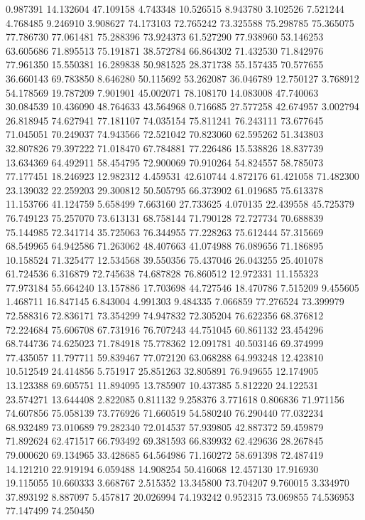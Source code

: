 0.987391
14.132604
47.109158
4.743348
10.526515
8.943780
3.102526
7.521244
4.768485
9.246910
3.908627
74.173103
72.765242
73.325588
75.298785
75.365075
77.786730
77.061481
75.288396
73.924373
61.527290
77.938960
53.146253
63.605686
71.895513
75.191871
38.572784
66.864302
71.432530
71.842976
77.961350
15.550381
16.289838
50.981525
28.371738
55.157435
70.577655
36.660143
69.783850
8.646280
50.115692
53.262087
36.046789
12.750127
3.768912
54.178569
19.787209
7.901901
45.002071
78.108170
14.083008
47.740063
30.084539
10.436090
48.764633
43.564968
0.716685
27.577258
42.674957
3.002794
26.818945
74.627941
77.181107
74.035154
75.811241
76.243111
73.677645
71.045051
70.249037
74.943566
72.521042
70.823060
62.595262
51.343803
32.807826
79.397222
71.018470
67.784881
77.226486
15.538826
18.837739
13.634369
64.492911
58.454795
72.900069
70.910264
54.824557
58.785073
77.177451
18.246923
12.982312
4.459531
42.610744
4.872176
61.421058
71.482300
23.139032
22.259203
29.300812
50.505795
66.373902
61.019685
75.613378
11.153766
41.124759
5.658499
7.663160
27.733625
4.070135
22.439558
45.725379
76.749123
75.257070
73.613131
68.758144
71.790128
72.727734
70.688839
75.144985
72.341714
35.725063
76.344955
77.228263
75.612444
57.315669
68.549965
64.942586
71.263062
48.407663
41.074988
76.089656
71.186895
10.158524
71.325477
12.534568
39.550356
75.437046
26.043255
25.401078
61.724536
6.316879
72.745638
74.687828
76.860512
12.972331
11.155323
77.973184
55.664240
13.157886
17.703698
44.727546
18.470786
7.515209
9.455605
1.468711
16.847145
6.843004
4.991303
9.484335
7.066859
77.276524
73.399979
72.588316
72.836171
73.354299
74.947832
72.305204
76.622356
68.376812
72.224684
75.606708
67.731916
76.707243
44.751045
60.861132
23.454296
68.744736
74.625023
71.784918
75.778362
12.091781
40.503146
69.374999
77.435057
11.797711
59.839467
77.072120
63.068288
64.993248
12.423810
10.512549
24.414856
5.751917
25.851263
32.805891
76.949655
12.174905
13.123388
69.605751
11.894095
13.785907
10.437385
5.812220
24.122531
23.574271
13.644408
2.822085
0.811132
9.258376
3.771618
0.806836
71.971156
74.607856
75.058139
73.776926
71.660519
54.580240
76.290440
77.032234
68.932489
73.010689
79.282340
72.014537
57.939805
42.887372
59.459879
71.892624
62.471517
66.793492
69.381593
66.839932
62.429636
28.267845
79.000620
69.134965
33.428685
64.564986
71.160272
58.691398
72.487419
14.121210
22.919194
6.059488
14.908254
50.416068
12.457130
17.916930
19.115055
10.660333
3.668767
2.515352
13.345800
73.704207
9.760015
3.334970
37.893192
8.887097
5.457817
20.026994
74.193242
0.952315
73.069855
74.536953
77.147499
74.250450
